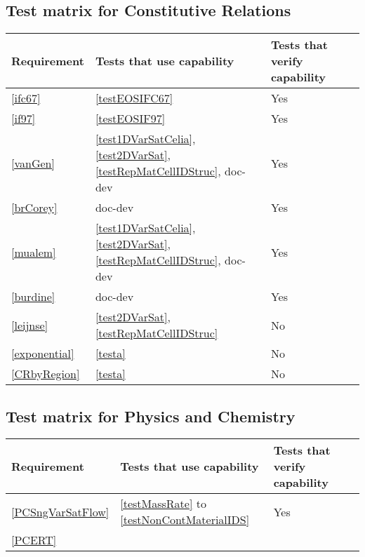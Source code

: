 \subsection{Test matrix for Constitutive Relations}
\begin{tabular}{|l|l|l|l|}
	\hline
	Requirement & Tests that use capability & Tests that verify capability \\
	\hline
	\hline
	\ref{ifc67} & \ref{testEOSIFC67} & Yes\\
	\hline
	\ref{if97} & \ref{testEOSIF97} & Yes \\
	\hline
		\ref{vanGen} & \ref{test1DVarSatCelia}, \ref{test2DVarSat}, \ref{testRepMatCellIDStruc}, doc-dev & Yes\\
	\hline
		\ref{brCorey} & doc-dev & Yes\\
	\hline
		\ref{mualem} & \ref{test1DVarSatCelia}, \ref{test2DVarSat},  \ref{testRepMatCellIDStruc}, doc-dev & Yes\\
	\hline
		\ref{burdine} & doc-dev & Yes\\
	\hline
		\ref{leijnse} &  \ref{test2DVarSat},  \ref{testRepMatCellIDStruc} & No \\
	\hline
		\ref{exponential} & \ref{testa} & No \\
	\hline
		\ref{CRbyRegion} & \ref{testa} & No \\
	\hline
\end{tabular}

\subsection{Test matrix for Physics and Chemistry}
\begin{tabular}{|l|l|l|l|}
	\hline
		Requirement & Tests that use capability & Tests that verify capability \\
	\hline
	\hline
		\ref{PCSngVarSatFlow} &  \ref{testMassRate} to \ref{testNonContMaterialIDS} & Yes \\
	\hline
		\ref{PCERT} &  & \\
	\hline
\end{tabular}

